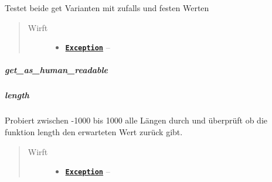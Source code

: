 \documentclass[letterpaper,10pt,ngerman]{sphinxmanual}
\begin{document}
\begin{fulllineitems}
\label{com/linuxluigi/polynomial/test/PolynomialTest:com.linuxluigi.polynomial.test.PolynomialTest.get()}
Testet beide get Varianten mit zufalls und festen Werten
\begin{quote}\begin{description}
\item[{Wirft}] \leavevmode\begin{itemize}
\item {} 
\href{http://docs.oracle.com/javase/8/docs/api/java/lang/Exception.html}{\textbf{\texttt{Exception}}} -- 

\end{itemize}

\end{description}\end{quote}

\end{fulllineitems}



\subparagraph{get\_as\_human\_readable}
\label{com/linuxluigi/polynomial/test/PolynomialTest:get-as-human-readable}

\begin{fulllineitems}
\label{com/linuxluigi/polynomial/test/PolynomialTest:com.linuxluigi.polynomial.test.PolynomialTest.get_as_human_readable()}
\end{fulllineitems}



\subparagraph{length}
\label{com/linuxluigi/polynomial/test/PolynomialTest:length}

\begin{fulllineitems}
\label{com/linuxluigi/polynomial/test/PolynomialTest:com.linuxluigi.polynomial.test.PolynomialTest.length()}
Probiert zwischen -1000 bis 1000 alle Längen durch und überprüft ob die funktion length den erwarteten Wert zurück gibt.
\begin{quote}\begin{description}
\item[{Wirft}] \leavevmode\begin{itemize}
\item {} 
\href{http://docs.oracle.com/javase/8/docs/api/java/lang/Exception.html}{\textbf{\texttt{Exception}}} -- 

\end{itemize}

\end{description}\end{quote}

\end{fulllineitems}
\end{document}
